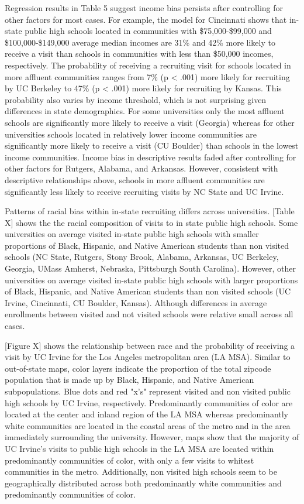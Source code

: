 \documentclass[twoside]{article}
\begin{document}
Regression results in Table 5 suggest income bias persists after controlling for other factors for most cases. For example, the model for Cincinnati shows that in-state public high schools located in communities with \$75,000-\$99,000 and \$100,000-\$149,000 average median incomes are 31\% and 42\% more likely to receive a visit than schools in communities with less than \$50,000 incomes, respectively. The probability of receiving a recruiting visit for schools located in more affluent communities ranges from 7\% (p < .001) more likely for recruiting by UC Berkeley to 47\% (p < .001) more likely for recruiting by Kansas. This probability also varies by income threshold, which is not surprising given differences in state demographics. For some universities only the most affluent schools are significantly more likely to receive a visit (Georgia) whereas for other universities schools located in relatively lower income communities are significantly more likely to receive a visit (CU Boulder) than schools in the lowest income communities. Income bias in descriptive results faded after controlling for other factors for Rutgers, Alabama, and Arkansas. However, consistent with descriptive relationships above, schools in more affluent communities are significantly less likely to receive recruiting visits by NC State and UC Irvine. 

Patterns of racial bias within in-state recruiting differs across universities. [Table X] shows the the racial composition of visits to in state public high schools. Some universities on average visited in-state public high schools with smaller proportions of Black, Hispanic, and Native American students than non visited schools (NC State, Rutgers, Stony Brook, Alabama, Arkansas, UC Berkeley, Georgia, UMass Amherst, Nebraska, Pittsburgh South Carolina). However, other universities on average visited in-state public high schools with larger proportions of Black,  Hispanic, and Native American students than non visited schools (UC Irvine, Cincinnati, CU Boulder, Kansas). Although differences in average enrollments between visited and not visited schools were relative small across all cases.

[Figure X] shows the relationship between race and the probability of receiving a visit by UC Irvine for the Los Angeles metropolitan area (LA MSA). Similar to out-of-state maps, color layers indicate the proportion of the total zipcode population that is made up by Black, Hispanic, and Native American subpopulations. Blue dots and red "x's" represent visited and non visited public high schools by UC Irvine, respectively. Predominantly communities of color are located at the center and inland region of the LA MSA whereas predominantly white communities are located in the coastal areas of the metro and in the area immediately surrounding the university. However, maps show that the majority of UC Irvine's visits to public high schools in the LA MSA are located within predominantly communities of color, with only a few visits to whitest communities in the metro. Additionally, non visited high schools seem to be geographically distributed across both predominantly white communities and predominantly communities of color. 
\end{document}
